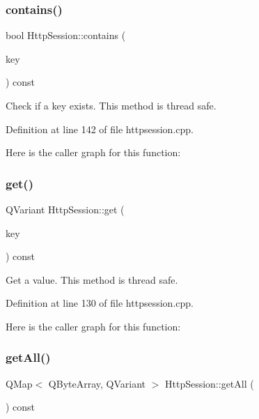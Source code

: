 \subsubsection{\texorpdfstring{contains()}{contains()}}
{\footnotesize\ttfamily bool Http\+Session\+::contains (\begin{DoxyParamCaption}\item[{const Q\+Byte\+Array \&}]{key }\end{DoxyParamCaption}) const}

Check if a key exists. This method is thread safe. 

Definition at line 142 of file httpsession.\+cpp.

Here is the caller graph for this function\+:
\mbox{\label{classstefanfrings_1_1_http_session_a6e5ae2c6d598511ca64acca9be0421be}} 
\subsubsection{\texorpdfstring{get()}{get()}}
{\footnotesize\ttfamily Q\+Variant Http\+Session\+::get (\begin{DoxyParamCaption}\item[{const Q\+Byte\+Array \&}]{key }\end{DoxyParamCaption}) const}

Get a value. This method is thread safe. 

Definition at line 130 of file httpsession.\+cpp.

Here is the caller graph for this function\+:
\mbox{\label{classstefanfrings_1_1_http_session_af38355ceaf0489097916a98ec0a0c736}} 
\subsubsection{\texorpdfstring{get\+All()}{getAll()}}
{\footnotesize\ttfamily Q\+Map$<$ Q\+Byte\+Array, Q\+Variant $>$ Http\+Session\+::get\+All (\begin{DoxyParamCaption}{ }\end{DoxyParamCaption}) const}

